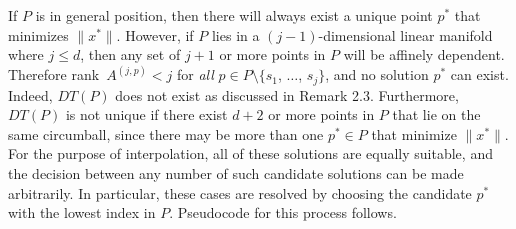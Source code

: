 If $P$ is in general position, then there will always exist a unique
point $p^*$ that minimizes $\|x^*\|$.
However, if $P$ lies in a $(j-1)$-dimensional linear manifold where
$j \leq d$, then any set of $j+1$ or more points in $P$ will be affinely
dependent.
Therefore rank~$A^{(j,p)} < j$ for {\it all}
$p \in P \setminus \{s_1$, $\ldots$, $s_j\}$, and no solution $p^*$
can exist. Indeed, $DT(P)$ does not exist as discussed in Remark 2.3.
Furthermore, $DT(P)$ is not unique if there exist $d+2$ or more
points in $P$ that lie on the same circumball, since there may be more
than one $p^* \in P$ that minimize $\|x^*\|$. For the purpose of
interpolation, all of these solutions are equally suitable, and the
decision between any number of such candidate solutions can be made
arbitrarily. In particular, these cases are resolved by choosing
the candidate $p^*$ with the lowest index in $P$. Pseudocode for this
process follows.

